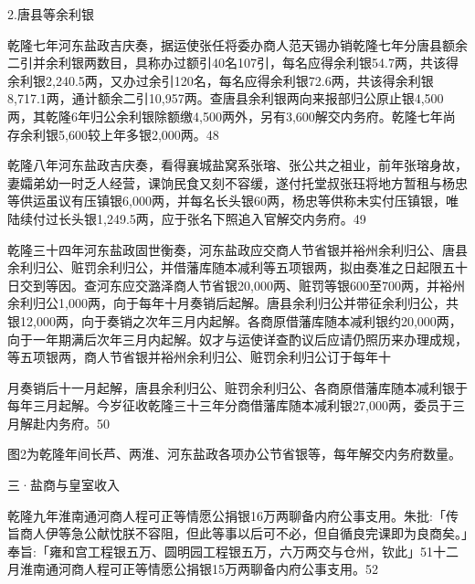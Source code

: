 2.唐县等余利银

乾隆七年河东盐政吉庆奏，据运使张任将委办商人范天锡办销乾隆七年分唐县额余二引并余利银两数目，具称办过额引40名107引，每名应得余利银54.7两，共该得余利银2,240.5两，又办过余引120名，每名应得余利银72.6两，共该得余利银8,717.1两，通计额余二引10,957两。查唐县余利银两向来报部归公原止银4,500两，其乾隆6年归公余利银除额缴4,500两外，另有3,600解交内务府。乾隆七年尚存余利银5,600较上年多银2,000两。48

乾隆八年河东盐政吉庆奏，看得襄城盐窝系张瑢、张公共之祖业，前年张瑢身故，妻孀弟幼一时乏人经营，课饷民食又刻不容缓，遂付托堂叔张珏将地方暂租与杨忠等供运虽议有压镇银6,000两，并每名长头银60两，杨忠等供称未实付压镇银，唯陆续付过长头银1,249.5两，应于张名下照追入官解交内务府。49

乾隆三十四年河东盐政固世衡奏，河东盐政应交商人节省银并裕州余利归公、唐县余利归公、赃罚余利归公，并借藩库随本减利等五项银两，拟由奏准之日起限五十日交到等因。查河东应交潞泽商人节省银20,000两、赃罚等银600至700两，并裕州余利归公1,000两，向于每年十月奏销后起解。唐县余利归公并带征余利归公，共银12,000两，向于奏销之次年三月内起解。各商原借藩库随本减利银约20,000两，向于一年期满后次年三月内起解。奴才与运使详查酌议后应请仍照历来办理成规，等五项银两，商人节省银并裕州余利归公、赃罚余利归公订于每年十

\vfill
\begin{BookNotes}
\end{BookNotes}

\noindent 月奏销后十一月起解，唐县余利归公、赃罚余利归公、各商原借藩库随本减利银于每年三月起解。今岁征收乾隆三十三年分商借藩库随本减利银27,000两，委员于三月解赴内务府。50

图2为乾隆年间长芦、两淮、河东盐政各项办公节省银等，每年解交内务府数量。


\noindent 三·盐商与皇室收入


乾隆九年淮南通河商人程可正等情愿公捐银16万两聊备内府公事支用。朱批:「传旨商人伊等急公献忱朕不容阻，但此等事以后可不必，但自循良完课即为良商矣。」奉旨:「雍和宫工程银五万、圆明园工程银五万，六万两交与仓州，钦此」51十二月淮南通河商人程可正等情愿公捐银15万两聊备内府公事支用。52

